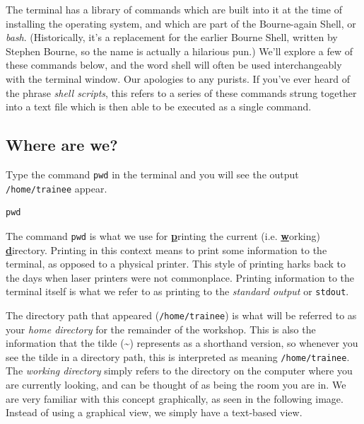 \documentclass[a4paper,12pt,twoside]{memoir}
\begin{document}
\begin{note}
The terminal has a library of commands which are built into it at the time of installing the operating system, and which are part of the Bourne-again Shell, or \textit{bash}.
(Historically, it's a replacement for the earlier Bourne Shell, written by Stephen Bourne, so the name is actually a hilarious pun.)
We'll explore a few of these commands below, and the word shell will often be used interchangeably with the terminal window.
Our apologies to any purists.
If you've ever heard of the phrase \textit{shell scripts}, this refers to a series of these commands strung together into a text file which is then able to be executed as a single command.
\end{note}

\subsection{Where are we?}
\begin{steps}
Type the command \texttt{pwd} in the terminal and you will see the output \texttt{/home/trainee} appear.
\begin{lstlisting}
pwd
\end{lstlisting}
\end{steps}

\begin{information}
The command \texttt{pwd} is what we use for \underline{\textbf{p}}rinting the current (i.e. \underline{\textbf{w}}orking) \underline{\textbf{d}}irectory.
Printing in this context means to print some information to the terminal, as opposed to a physical printer.
This style of printing harks back to the days when laser printers were not commonplace.
Printing information to the terminal itself is what we refer to as printing to the \textit{standard output} or \texttt{stdout}.
\end{information}

\begin{note}
The directory path that appeared  (\texttt{/home/trainee})  is what will be referred to as your \textit{home directory} for the remainder of the workshop.
This is also the information that the tilde (\~{}) represents as a shorthand version, so whenever you see the tilde in a directory path, this is interpreted as meaning \texttt{/home/trainee}. 
The \textit{working directory} simply refers to the directory on the computer where you are currently looking, and can be thought of as being the room you are in.
We are very familiar with this concept graphically, as seen in the following image.
Instead of using a graphical view, we simply have a text-based view.\\
\end{note}
\end{document}
